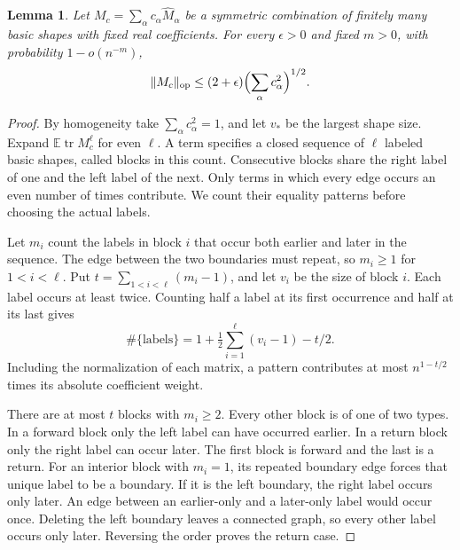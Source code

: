 \documentclass[11pt,letterpaper]{article}
\newtheorem{lemma}{Lemma}[section]
\newcommand{\E}{\mathbb E}
\newcommand{\tr}{\operatorname{tr}}
\newcommand{\norm}[1]{\lVert #1\rVert}
\newcommand{\op}{\mathrm{op}}
\begin{document}
\begin{lemma}\label{lem:sharp}
Let \(M_c=\sum_\alpha c_\alpha\widehat M_\alpha\) be a symmetric
combination of finitely many basic shapes with fixed real coefficients.
For every \(\epsilon>0\) and fixed \(m>0\), with probability
\(1-o(n^{-m})\),
\begin{equation}\label{eq:sharp}
 \norm{M_c}_{\op}\le(2+\epsilon)\Bigl(\sum_\alpha c_\alpha^2\Bigr)^{1/2}.
\end{equation}
\end{lemma}

\begin{proof}
By homogeneity take \(\sum_\alpha c_\alpha^2=1\), and let \(v_\ast\) be the
largest shape size. Expand \(\E\tr M_c^\ell\) for even \(\ell\).
A term specifies a closed sequence of \(\ell\) labeled basic shapes,
called blocks in this count. Consecutive blocks share the right label
of one and the left label of the next. Only terms in which every edge
occurs an even number of times contribute. We count their equality
patterns before choosing the actual labels.

Let \(m_i\) count the labels in block \(i\) that occur both earlier and
later in the sequence. The edge between the two boundaries must
repeat, so \(m_i\ge1\) for \(1<i<\ell\). Put
\(t=\sum_{1<i<\ell}(m_i-1)\), and let \(v_i\) be the size of block
\(i\). Each label occurs at least twice. Counting half a label at
its first occurrence and half at its last gives
\[
 \#\{\text{labels}\}=1+\tfrac12\sum_{i=1}^\ell(v_i-1)-t/2.
\]
Including the normalization of each matrix, a pattern contributes at
most \(n^{1-t/2}\) times its absolute coefficient weight.

There are at most \(t\) blocks with \(m_i\ge2\). Every other block is
of one of two types. In a forward block only the left label can have
occurred earlier. In a return block only the right label can occur
later. The first block is forward and the last is a return. For an
interior block with \(m_i=1\), its repeated boundary edge forces that
unique label to be a boundary. If it is the left boundary, the right
label occurs only later. An edge between an earlier-only and a
later-only label would occur once. Deleting the left boundary leaves
a connected graph, so every other label occurs only later. Reversing
the order proves the return case.


\end{proof}
\end{document}
